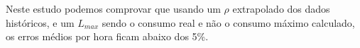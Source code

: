 





Neste estudo podemos comprovar que usando um $\rho$ extrapolado dos dados históricos, e um $L_{max}$ sendo o consumo real e não o consumo máximo calculado, os erros médios por hora ficam abaixo dos 5\%.\par